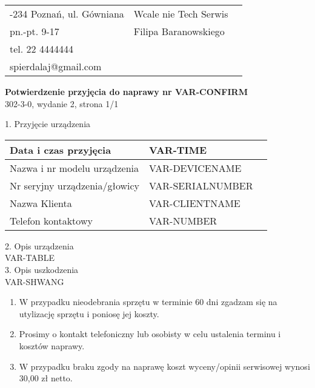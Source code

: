 \documentclass{article}
\begin{document}
\begin{tabularx}{\textwidth} { 
   >{\raggedright\arraybackslash}X 
   >{\centering\arraybackslash}X 
   >{\raggedleft\arraybackslash}X  }

61-234 Poznań, ul. Gówniana & \hspace{4mm} Wcale nie Tech Serwis \\
pn.-pt. 9-17 & \hspace{4mm}  Filipa Baranowskiego\\
tel. 22 4444444 &\\
spierdalaj@gmail.com &\\
\end{tabularx}


\begin{center}
\textbf{Potwierdzenie przyjęcia do naprawy nr VAR-CONFIRM} \\
302-3-0, wydanie 2, strona 1/1\\
\end{center}

1. Przyjęcie urządzenia\\
\begin{tabularx}{\textwidth} { 
  | >{\raggedright\arraybackslash}X 
  | >{\centering\arraybackslash}X 
  | >{\raggedleft\arraybackslash}X | }
\hline 
 Data i czas przyjęcia & VAR-TIME \\ 
\hline
 Nazwa i nr modelu urządzenia & VAR-DEVICENAME  \\  
\hline
 Nr seryjny urządzenia/głowicy & VAR-SERIALNUMBER   \\
\hline
Nazwa Klienta & VAR-CLIENTNAME \\
\hline
Telefon kontaktowy & VAR-NUMBER \\
\hline
\end{tabularx}\vspace{2mm}
2. Opis urządzenia \\
\vspace{2mm}
VAR-TABLE
\vspace{1mm} \\
3. Opis uszkodzenia \\
VAR-SHWANG
\begin{footnotesize}
\begin{enumerate}
\item W przypadku nieodebrania sprzętu w terminie 60 dni zgadzam się na utylizację sprzętu i poniosę jej koszty.\\
\item Prosimy o kontakt telefoniczny lub osobisty w celu ustalenia terminu i kosztów naprawy.\\
\item W przypadku braku zgody na naprawę koszt wyceny/opinii serwisowej wynosi 30,00 zł netto.
\end{enumerate}
\end{footnotesize} \vspace{3mm}
\end{document}
